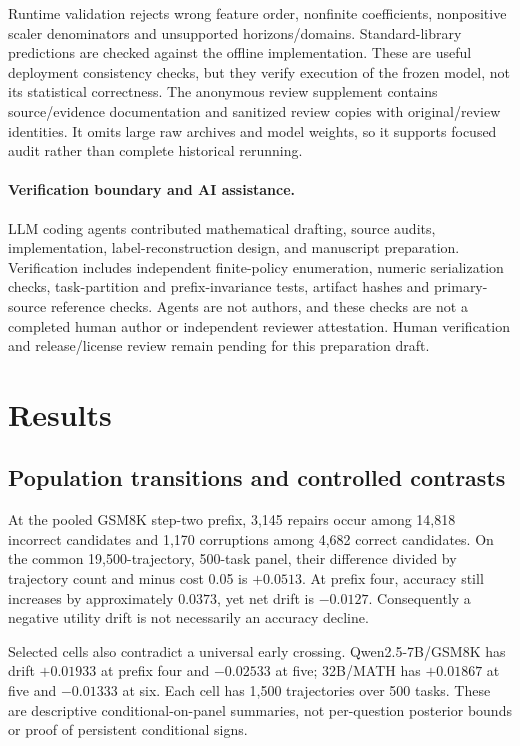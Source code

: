 \documentclass{article}
\begin{document}
Runtime validation rejects wrong feature order, nonfinite coefficients,
nonpositive scaler denominators and unsupported horizons/domains. Standard-library
predictions are checked against the offline implementation. These are useful
deployment consistency checks, but they verify execution of the frozen model,
not its statistical correctness. The anonymous review supplement contains
source/evidence documentation and sanitized review copies with original/review
identities. It omits large raw archives and model weights, so it supports
focused audit rather than complete historical rerunning.

\paragraph{Verification boundary and AI assistance.}
LLM coding agents contributed mathematical drafting, source audits, implementation,
label-reconstruction design, and manuscript preparation. Verification includes
independent finite-policy enumeration, numeric serialization checks,
task-partition and prefix-invariance tests, artifact hashes and primary-source
reference checks. Agents are not authors, and these checks are not a completed
human author or independent reviewer attestation. Human verification and
release/license review remain pending for this preparation draft.

\section{Results}
\label{sec:results}
\subsection{Population transitions and controlled contrasts}
At the pooled GSM8K step-two prefix, 3,145 repairs occur among 14,818 incorrect
candidates and 1,170 corruptions among 4,682 correct candidates. On the common
19,500-trajectory, 500-task panel, their difference divided by trajectory count
and minus cost 0.05 is \(+0.0513\). At prefix four, accuracy still increases by
approximately \(0.0373\), yet net drift is \(-0.0127\). Consequently a negative
utility drift is not necessarily an accuracy decline.

Selected cells also contradict a universal early crossing. Qwen2.5-7B/GSM8K
has drift \(+0.01933\) at prefix four and \(-0.02533\) at five; 32B/MATH has
\(+0.01867\) at five and \(-0.01333\) at six. Each cell has 1,500 trajectories
over 500 tasks. These are descriptive conditional-on-panel summaries, not
per-question posterior bounds or proof of persistent conditional signs.
\end{document}

